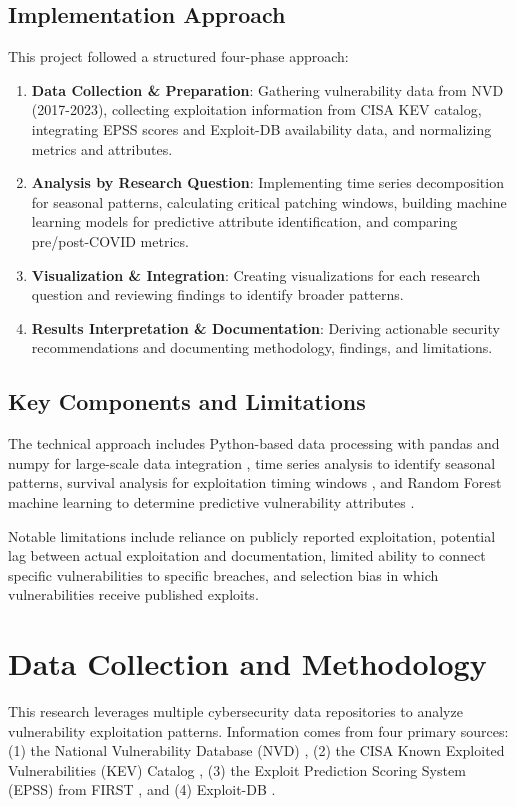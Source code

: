 \documentclass[runningheads]{llncs}
\begin{document}
\subsection{Implementation Approach}
This project followed a structured four-phase approach:

\begin{enumerate}
    \item \textbf{Data Collection \& Preparation}: Gathering vulnerability data from NVD (2017-2023), collecting exploitation information from CISA KEV catalog, integrating EPSS scores and Exploit-DB availability data, and normalizing metrics and attributes.
    
    \item \textbf{Analysis by Research Question}: Implementing time series decomposition for seasonal patterns, calculating critical patching windows, building machine learning models for predictive attribute identification, and comparing pre/post-COVID metrics.
    
    \item \textbf{Visualization \& Integration}: Creating visualizations for each research question and reviewing findings to identify broader patterns.
    
    \item \textbf{Results Interpretation \& Documentation}: Deriving actionable security recommendations and documenting methodology, findings, and limitations.
\end{enumerate}

\subsection{Key Components and Limitations}

The technical approach includes Python-based data processing with pandas and numpy for large-scale data integration \cite{allodi2012preliminary}, time series analysis to identify seasonal patterns, survival analysis for exploitation timing windows \cite{spring2021time}, and Random Forest machine learning to determine predictive vulnerability attributes \cite{breiman2001random}.

Notable limitations include reliance on publicly reported exploitation, potential lag between actual exploitation and documentation, limited ability to connect specific vulnerabilities to specific breaches, and selection bias in which vulnerabilities receive published exploits.

\section{Data Collection and Methodology}
This research leverages multiple cybersecurity data repositories to analyze vulnerability exploitation patterns. Information comes from four primary sources: (1) the National Vulnerability Database (NVD) \cite{nvd_nist}, (2) the CISA Known Exploited Vulnerabilities (KEV) Catalog \cite{cisa_kev}, (3) the Exploit Prediction Scoring System (EPSS) from FIRST \cite{epss_first}, and (4) Exploit-DB \cite{exploit_db}.
\end{document}
